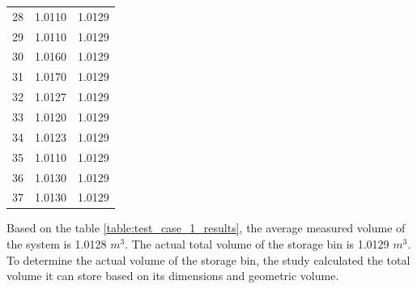 \begin{table}[H]
\begin{threeparttable}
\begin{tabular}{l c r}
			28              & 1.0110                                                   & 1.0129                                                  \\
			29              & 1.0110                                                   & 1.0129                                                  \\
			30              & 1.0160                                                   & 1.0129                                                  \\
			31              & 1.0170                                                   & 1.0129                                                  \\
			32              & 1.0127                                                   & 1.0129                                                  \\
			33              & 1.0120                                                   & 1.0129                                                  \\
			34              & 1.0123                                                   & 1.0129                                                  \\
			35              & 1.0110                                                   & 1.0129                                                  \\
			36              & 1.0130                                                   & 1.0129                                                  \\
			37              & 1.0130                                                   & 1.0129                                                  \\ \bottomrule
		\end{tabular}
	\end{threeparttable}
\end{table}



Based on the table \ref{table:test_case_1_results}, the average measured volume of the system is 1.0128 $m^3$. The actual total volume of the storage bin is 1.0129 $m^3$. To determine the actual volume of the storage bin, the study calculated the total volume it can store based on its dimensions and geometric volume.


